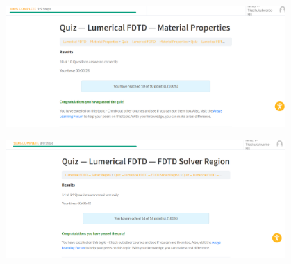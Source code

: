 \documentclass[11pt,a4paper]{article}
\begin{document}
\begin{figure}[ht]
        \includegraphics[width=0.95\textwidth]{fig3.png}
\end{figure}

\begin{figure}[ht]
    \includegraphics[width=0.95\textwidth]{fig4.png}
\end{figure}
\end{document}
